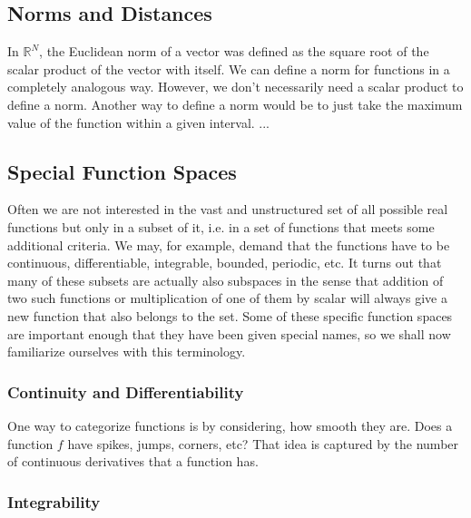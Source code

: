 \subsection{Norms and Distances}
In $\mathbb{R}^N$, the Euclidean norm of a vector was defined as the square root of the scalar product of the vector with itself. We can define a norm for functions in a completely analogous way. However, we don't necessarily need a scalar product to define a norm. Another way to define a norm would be to just take the maximum value of the function within a given interval. ...

\subsection{Special Function Spaces}
Often we are not interested in the vast and unstructured set of all possible real functions but only in a subset of it, i.e. in a set of functions that meets some additional criteria. We may, for example, demand that the functions have to be continuous, differentiable, integrable, bounded, periodic, etc. It turns out that many of these subsets are actually also subspaces in the sense that addition of two such functions or multiplication of one of them by scalar will always give a new function that also belongs to the set. Some of these specific function spaces are important enough that they have been given special names, so we shall now familiarize ourselves with this terminology.

\subsubsection{Continuity and Differentiability}
One way to categorize functions is by considering, how smooth they are. Does a function $f$ have spikes, jumps, corners, etc? That idea is captured by the number of continuous derivatives that a function has.

\subsubsection{Integrability}


